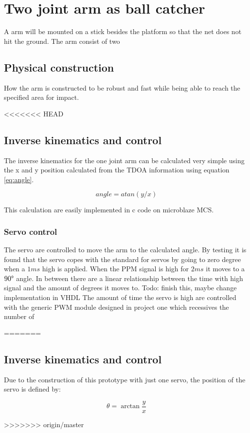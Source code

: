 \chapter{Two joint arm as ball catcher}
\label{catcherArm}
	A arm will be mounted on a stick besides the platform so that the net does not hit the ground. The arm consist of two

	\section{Physical construction}
	\label{armConstruction}
		How the arm is constructed to be robust and fast while being able to reach the specified area for impact.

<<<<<<< HEAD
\section{Inverse kinematics and control }
\label{kinematics}
The inverse kinematics for the one joint arm can be calculated very simple using the x and y position calculated from the TDOA information using equation \ref{eq:angle}.

\begin{equation}
	angle = atan(y/x)
	\label{eq:angle}
\end{equation}

This calculation are easily implemented in c code on microblaze MCS. 

\subsection{Servo control}
The servo are controlled to move the arm to the calculated angle. By testing it is found that the servo copes with the standard for servos by going to zero degree when a $1\si{ms}$ high is applied. When the PPM signal is high for $2\si{ms}$ it moves to a $90\degree$ angle. In between there are a linear relationship between the time with high signal and the amount of degrees it moves to.
Todo: finish this, maybe change implementation in VHDL
The amount of time the servo is high are controlled with the generic PWM module designed in project one which recessives the number of   


=======

	\section{Inverse kinematics and control}
	\label{kinematics}
		Due to the construction of this prototype with just one servo, the position of the servo is defined by:

		$$\theta = \arctan\frac{y}{x}$$

>>>>>>> origin/master
